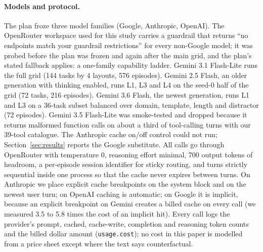 \paragraph{Models and protocol.} The plan froze three model families (Google, Anthropic, OpenAI). The OpenRouter workspace used for this study carries a guardrail that returns ``no endpoints match your guardrail restrictions'' for every non-Google model; it was probed before the plan was frozen and again after the main grid, and the plan's stated fallback applies: a one-family capability ladder. Gemini 3.1 Flash-Lite runs the full grid (144 tasks by 4 layouts, 576 episodes). Gemini 2.5 Flash, an older generation with thinking enabled, runs L1, L3 and L4 on the seed-0 half of the grid (72 tasks, 216 episodes). Gemini 3.6 Flash, the newest generation, runs L1 and L3 on a 36-task subset balanced over domain, template, length and distractor (72 episodes). Gemini 3.5 Flash-Lite was smoke-tested and dropped because it returns malformed function calls on about a third of tool-calling turns with our 39-tool catalogue. The Anthropic cache on/off control could not run; Section~\ref{sec:results} reports the Google substitute. All calls go through OpenRouter with temperature 0, reasoning effort minimal, 700 output tokens of headroom, a per-episode session identifier for sticky routing, and turns strictly sequential inside one process so that the cache never expires between turns. On Anthropic we place explicit cache breakpoints on the system block and on the newest user turn; on OpenAI caching is automatic; on Google it is implicit, because an explicit breakpoint on Gemini creates a billed cache on every call (we measured 3.5 to 5.8 times the cost of an implicit hit). Every call logs the provider's prompt, cached, cache-write, completion and reasoning token counts and the billed dollar amount (\texttt{usage.cost}); no cost in this paper is modelled from a price sheet except where the text says counterfactual.

